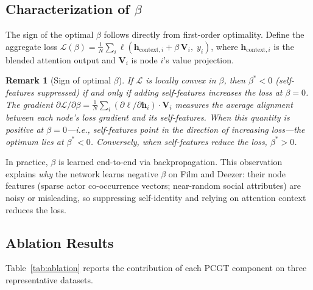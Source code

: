 \documentclass[manuscript, screen, review, anonymous]{acmart}
\newtheorem{remark}{Remark}
\begin{document}
\subsection{Characterization of $\beta$}
\label{sec:beta_analysis}

The sign of the optimal $\beta$ follows directly from first-order optimality. Define the aggregate loss $\mathcal{L}(\beta) = \frac{1}{N} \sum_{i} \ell(\mathbf{h}_{\text{context},i} + \beta\,\mathbf{V}_i,\; y_i)$, where $\mathbf{h}_{\text{context},i}$ is the blended attention output and $\mathbf{V}_i$ is node $i$'s value projection.

\begin{remark}[Sign of optimal $\beta$]
\label{prop:beta}
If $\mathcal{L}$ is locally convex in $\beta$, then $\beta^* < 0$ (self-features suppressed) if and only if adding self-features increases the loss at $\beta = 0$. The gradient $\partial \mathcal{L}/\partial \beta = \frac{1}{N}\sum_i (\partial \ell / \partial \mathbf{h}_i) \cdot \mathbf{V}_i$ measures the average alignment between each node's loss gradient and its self-features. When this quantity is positive at $\beta{=}0$---i.e., self-features point in the direction of \emph{increasing} loss---the optimum lies at $\beta^* < 0$. Conversely, when self-features reduce the loss, $\beta^* > 0$.
\end{remark}

In practice, $\beta$ is learned end-to-end via backpropagation. This observation explains \emph{why} the network learns negative $\beta$ on Film and Deezer: their node features (sparse actor co-occurrence vectors; near-random social attributes) are noisy or misleading, so suppressing self-identity and relying on attention context reduces the loss.

\subsection{Ablation Results}
\label{sec:ablation_results}

Table~\ref{tab:ablation} reports the contribution of each PCGT component on three representative datasets.
\end{document}
